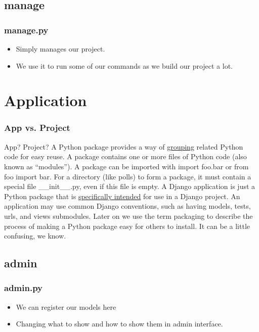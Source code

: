 \documentclass{beamer}
\begin{document}
\subsection{manage}
\begin{frame}
	\frametitle{manage.py}
	\begin{itemize}
		\item Simply manages our project.
		\item We use it to run some of our commands as we build our project a lot.
	\end{itemize}
\end{frame}


\section{Application}
\begin{frame}
	\frametitle{App vs. Project}
	\begin{block}{App? Project?}
		A Python package provides a way of \underline{grouping} related Python code for easy reuse. A package contains one or more files of Python code (also known as “modules”).
		\newline
		A package can be imported with import foo.bar or from foo import bar. For a directory (like polls) to form a package, it must contain a special file \_\_init\_\_.py, even if this file is empty.
		\newline
		A Django application is just a Python package that is \underline{specifically intended} for use in a Django project. An application may use common Django conventions, such as having models, tests, urls, and views submodules.
		\newline
		Later on we use the term packaging to describe the process of making a Python package easy for others to install. It can be a little confusing, we know.
		
	\end{block}
\end{frame}

\subsection{admin}
\begin{frame}
	\frametitle{admin.py}
	\begin{itemize}
		\item We can register our models here
		\item Changing what to show and how to show them in admin interface.
	\end{itemize}
\end{frame}
\end{document}
